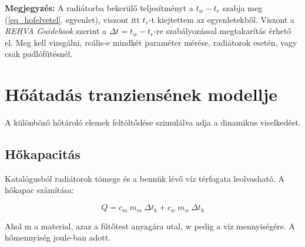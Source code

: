 \begin{formal}
	\textbf{Megjegyzés:} A radiátorba bekerülő teljesítményt a $t_w-t_r$ szabja meg (\ref{eq_hofelvetel}. egyenlet), viszont itt $t_r$-t kiejtettem az egyenletekből. Viszont a \textit{REHVA Guidebook}
	\cite{RehvaGuidebookNo7} szerint a $\Delta t= t_w-t_r$-re szabályozással megtakarítás érhető el. Meg kell vizsgálni, reális-e mindkét paraméter mérése, radiátorok esetén, vagy csak padlófűtésnél.
\end{formal}

%




\section{Hőátadás tranziensének modellje}\label{section:dinamikus}








A különböző hőtároló elemek feltöltődése szimulálva adja a dinamikus viselkedést.


\subsection{Hőkapacitás}

Katalógusból radiátorok tömege és a bennük lévő víz térfogata leolvasható. A hőkapac számítása:

\begin{equation} \label{eq_hotartalom}
Q = c_{m} ~ m_m ~ \Delta t_k + c_{w} ~ m_w ~ \Delta t_k
\end{equation}

Ahol m a material, azaz a fűtőtest anyagára utal, w pedig a víz mennyiségére. A hőmennyiség joule-ban adott.


